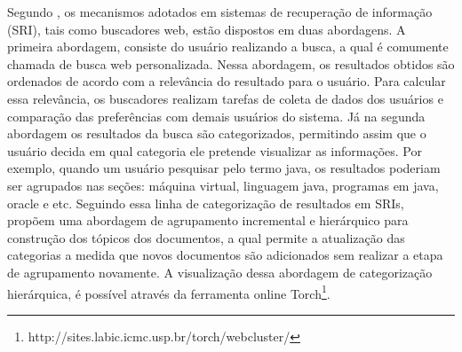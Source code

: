 Segundo \cite{Matsumoto10}, os mecanismos adotados em sistemas de recuperação de informação (SRI),
tais como buscadores web, estão dispostos em duas abordagens. A primeira abordagem, consiste do
usuário realizando a busca, a qual é comumente chamada de busca web personalizada.  Nessa abordagem,
os resultados obtidos são ordenados de acordo com a relevância do resultado para o usuário. Para
calcular essa relevância, os buscadores realizam tarefas de coleta de dados dos usuários e
comparação das preferências com demais usuários do sistema. Já na segunda abordagem os resultados da
busca são categorizados, permitindo assim que o usuário decida em qual categoria ele pretende
visualizar as informações. Por exemplo, quando um usuário pesquisar pelo termo java, os resultados
poderiam ser agrupados nas seções: máquina virtual, linguagem java, programas em java, oracle e etc.
Seguindo essa linha de categorização de resultados em SRIs, \cite{MarcaciniR10} propõem uma
abordagem de agrupamento incremental e hierárquico para construção dos tópicos dos documentos, a
qual permite a atualização das categorias a medida que novos documentos são adicionados sem realizar
a etapa de agrupamento novamente. A visualização dessa abordagem de categorização hierárquica, é
possível através da ferramenta online
Torch\footnote{http://sites.labic.icmc.usp.br/torch/webcluster/}.


